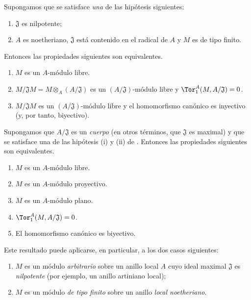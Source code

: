 \documentclass[oneside]{amsart}
\newcommand{\oldpage}[2][]{{\marginnote{\normalfont\textbf{#1}~|~#2}}\ignorespaces}
\let\EGAOriginalLabel\label
\renewcommand{\label}[1]{\phantomsection\EGAOriginalLabel{#1}}
\begin{document}
\oldpage[0\textsubscript{III-1}]{18}
\begin{env}[10.1.2]
\label{0.10.1.2}
Supongamos que se satisface \emph{una} de las hipótesis siguientes:
\begin{enumerate}
  \item[(i)] $\mathfrak{J}$ es nilpotente;
  \item[(ii)] $A$ es noetheriano, $\mathfrak{J}$ está contenido en el radical de $A$ y $M$ es de tipo finito.
\end{enumerate}
Entonces las propiedades siguientes son equivalentes.
\begin{enumerate}
  \item[(a)] $M$ es un $A$-módulo libre.
  \item[(b)] $M/\mathfrak{J}M=M\otimes_A(A/\mathfrak{J})$ es un $(A/\mathfrak{J})$-módulo libre y $\Tor_1^A(M,A/\mathfrak{J})=0$.
  \item[(c)] $M/\mathfrak{J}M$ es un $(A/\mathfrak{J})$-módulo libre y el homomorfismo canónico  es inyectivo (y, por tanto, biyectivo).
\end{enumerate}
\end{env}

\begin{env}[10.1.3]
\label{0.10.1.3}
Supongamos que $A/\mathfrak{J}$ es un \emph{cuerpo} (en otros términos, que $\mathfrak{J}$ es maximal) y que se satisface una de las hipótesis (i) y (ii) de .
Entonces las propiedades siguientes son equivalentes.
\begin{enumerate}
  \item[(a)] $M$ es un $A$-módulo libre.
  \item[(b)] $M$ es un $A$-módulo proyectivo.
  \item[(c)] $M$ es un $A$-módulo plano.
  \item[(d)] $\Tor_1^A(M,A/\mathfrak{J})=0$.
  \item[(e)] El homomorfismo canónico  es biyectivo.
\end{enumerate}

Este resultado puede aplicarse, en particular, a los dos casos siguientes:
\begin{enumerate}
  \item[(i)] $M$ es un módulo \emph{arbitrario} sobre un anillo local $A$ cuyo ideal maximal $\mathfrak{J}$ es \emph{nilpotente} (por ejemplo, un anillo artiniano local);
  \item[(ii)] $M$ es un módulo \emph{de tipo finito} sobre un anillo \emph{local noetheriano}.
\end{enumerate}
\end{env}
\end{document}
